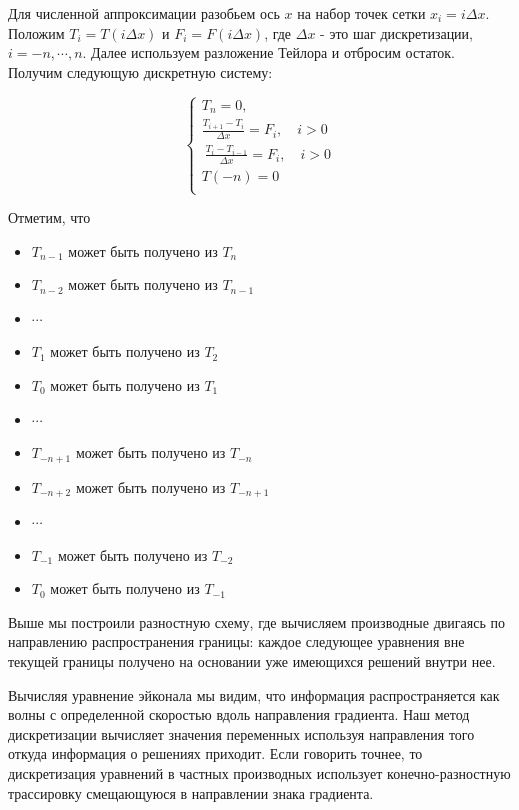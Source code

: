 Для численной аппроксимации разобьем ось $x$ на набор точек сетки
$x_i=i\Delta x$. Положим $T_i = T(i \Delta x)$ и $F_i = F(i \Delta
x)$, где $\Delta x$ - это шаг дискретизации, $i = -n, \cdots,
n$. Далее используем разложение Тейлора и отбросим остаток. Получим
следующую дискретную систему:

\begin{equation}
  \label{eq:discretise}
  \left\{
    \begin{array}{ll}
      T_n = 0,\\
      \frac{T_{i+1} - T_i}{\Delta x} = F_i, \quad i>0 \\\
      \frac{T_{i} - T_{i-1}}{\Delta x} = F_i, \quad i>0\\
      T(-n) = 0\\
    \end{array}
  \right.
\end{equation}

Отметим, что
\begin{itemize}
\item[ ] $T_{n-1}$ может быть получено из $T_n$
\item[ ] $T_{n-2}$ может быть получено из $T_{n-1}$
\item[ ]  $\cdots$
\item[ ] $T_{1}$ может быть получено из $T_2$
\item[ ] $T_{0}$ может быть получено из $T_{1}$
\item[ ]  $\cdots$
\item[ ] $T_{-n+1}$ может быть получено из $T_{-n}$
\item[ ] $T_{-n+2}$ может быть получено из $T_{-n+1}$
\item[ ]  $\cdots$
\item[ ] $T_{-1}$ может быть получено из $T_{-2}$
\item[ ] $T_{0}$ может быть получено из $T_{-1}$

\end{itemize}

Выше мы построили разностную схему, где вычисляем производные двигаясь
по направлению распространения границы: каждое следующее уравнения вне
текущей границы получено на основании уже имеющихся решений внутри
нее.

Вычисляя уравнение эйконала мы видим, что информация распространяется
как волны с определенной скоростью вдоль направления градиента. Наш
метод дискретизации вычисляет значения переменных используя
направления того откуда информация о решениях приходит. Если говорить
точнее, то дискретизация уравнений в частных производных использует
конечно-разностную трассировку смещающуюся в направлении знака
градиента.

